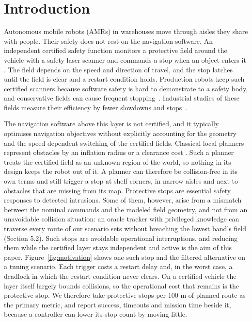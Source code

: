 \section{Introduction}

Autonomous mobile robots (AMRs) in warehouses move through aisles they share with people. Their safety does not rest on the navigation software. An independent certified safety function monitors a protective field around the vehicle with a safety laser scanner and commands a stop when an object enters it \cite{iso3691-4,iec61496-3}. The field depends on the speed and direction of travel, and the stop latches until the field is clear and a restart condition holds. Production robots keep such certified scanners because software safety is hard to demonstrate to a safety body, and conservative fields can cause frequent stopping~\cite{liu2017}. Industrial studies of these fields measure their efficiency by fewer slowdowns and stops~\cite{muhammad2021}.

The navigation software above this layer is not certified, and it typically optimises navigation objectives without explicitly accounting for the geometry and the speed-dependent switching of the certified fields. Classical local planners represent obstacles by an inflation radius or a clearance cost \cite{coulter1992purepursuit,macenski2023rpp,fox1997dwa}. Such a planner treats the certified field as an unknown region of the world, so nothing in its design keeps the robot out of it. A planner can therefore be collision-free in its own terms and still trigger a stop at shelf corners, in narrow aisles and next to obstacles that are missing from its map. Protective stops are essential safety responses to detected intrusions. Some of them, however, arise from a mismatch between the nominal commands and the modeled field geometry, and not from an unavoidable collision situation: an oracle tracker with privileged knowledge can traverse every route of our scenario sets without breaching the lowest band's field (Section 5.2). Such stops are avoidable operational interruptions, and reducing them while the certified layer stays independent and active is the aim of this paper. Figure~\ref{fig:motivation} shows one such stop and the filtered alternative on a tuning scenario. Each trigger costs a restart delay and, in the worst case, a deadlock in which the restart condition never clears. On a certified vehicle the layer itself largely bounds collisions, so the operational cost that remains is the protective stop. We therefore take protective stops per 100 m of planned route as the primary metric, and report success, timeouts and mission time beside it, because a controller can lower its stop count by moving little.

